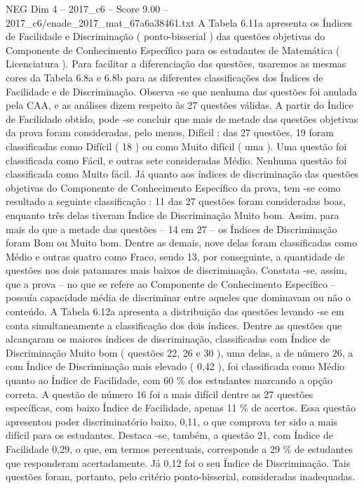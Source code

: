 \begin{textsample}{NEG Dim 4 – 2017\_c6 – Score 9.00 – 2017\_c6/enade\_2017\_mat\_67a6a38461.txt}
A Tabela 6.11a apresenta os Índices de Facilidade e Discriminação ( ponto-bisserial ) das questões objetivas do Componente de Conhecimento Específico para os estudantes de Matemática ( Licenciatura ).
Para facilitar a diferenciação das questões, usaremos as mesmas cores da Tabela 6.8a e 6.8b para as diferentes classificações dos Índices de Facilidade e de Discriminação.
Observa -se que nenhuma das questões foi anulada pela CAA, e as análises dizem respeito às 27 questões válidas.
A partir do Índice de Facilidade obtido, pode -se concluir que mais de metade das questões objetivas da prova foram consideradas, pelo menos, Difícil : das 27 questões, 19 foram classificadas como Difícil ( 18 ) ou como Muito difícil ( uma ).
Uma questão foi classificada como Fácil, e outras sete consideradas Médio.
Nenhuma questão foi classificada como Muito fácil.
Já quanto aos índices de discriminação das questões objetivas do Componente de Conhecimento Específico da prova, tem -se como resultado a seguinte classificação : 11 das 27 questões foram consideradas boas, enquanto três delas tiveram Índice de Discriminação Muito bom.
Assim, para mais do que a metade das questões – 14 em 27 – os Índices de Discriminação foram Bom ou Muito bom.
Dentre as demais, nove delas foram classificadas como Médio e outras quatro como Fraco, sendo 13, por conseguinte, a quantidade de questões nos dois patamares mais baixos de discriminação.
Constata -se, assim, que a prova – no que se refere ao Componente de Conhecimento Específico – possuía capacidade média de discriminar entre aqueles que dominavam ou não o conteúdo.
A Tabela 6.12a apresenta a distribuição das questões levando -se em conta simultaneamente a classificação dos dois índices.
Dentre as questões que alcançaram os maiores índices de discriminação, classificadas com Índice de Discriminação Muito bom ( questões 22, 26 e 30 ), uma delas, a de número 26, a com Índice de Discriminação mais elevado ( 0,42 ), foi classificada como Médio quanto ao Índice de Facilidade, com 60 \% dos estudantes marcando a opção correta.
A questão de número 16 foi a mais difícil dentre as 27 questões específicas, com baixo Índice de Facilidade, apenas 11 \% de acertos.
Essa questão apresentou poder discriminatório baixo, 0,11, o que comprova ter sido a mais difícil para os estudantes.
Destaca -se, também, a questão 21, com Índice de Facilidade 0,29, o que, em termos percentuais, corresponde a 29 \% de estudantes que responderam acertadamente.
Já 0,12 foi o seu Índice de Discriminação.
Tais questões foram, portanto, pelo critério ponto-bisserial, consideradas inadequadas.

\end{textsample}
